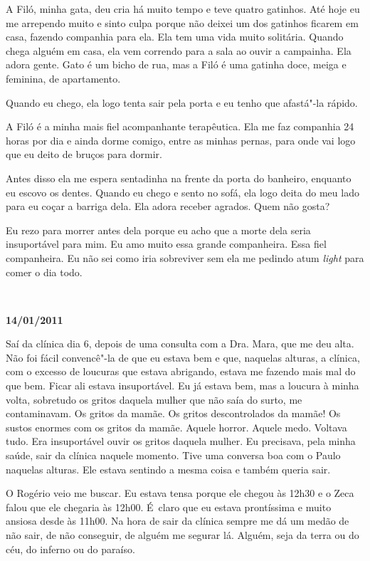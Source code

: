 A Filó, minha gata, deu cria há muito tempo e teve quatro gatinhos. Até
hoje eu me arrependo muito e sinto culpa porque não deixei um dos
gatinhos ficarem em casa, fazendo companhia para ela. Ela tem uma vida
muito solitária. Quando chega alguém em casa, ela vem correndo para a
sala ao ouvir a campainha. Ela adora gente. Gato é um bicho de rua, mas
a Filó é uma gatinha doce, meiga e feminina, de apartamento.

Quando eu chego, ela logo tenta sair pela porta e eu tenho que afastá"-la
rápido.

A Filó é a minha mais fiel acompanhante terapêutica. Ela me faz
companhia 24 horas por dia e ainda dorme comigo, entre as minhas pernas,
para onde vai logo que eu deito de bruços para dormir.

Antes disso ela me espera sentadinha na frente da porta do banheiro,
enquanto eu escovo os dentes. Quando eu chego e sento no sofá, ela logo
deita do meu lado para eu coçar a barriga dela. Ela adora receber
agrados. Quem não gosta?

Eu rezo para morrer antes dela porque eu acho que a morte dela seria
insuportável para mim. Eu amo muito essa grande companheira. Essa fiel
companheira. Eu não sei como iria sobreviver sem ela me pedindo atum
\emph{light} para comer o dia todo.

\begin{center}\asterisc{}​\end{center}

\begin{flushright}\textbf{14/01/2011}\end{flushright}


Saí da clínica dia 6, depois de uma consulta com a Dra. Mara, que me deu
alta. Não foi fácil convencê"-la de que eu estava bem e que, naquelas
alturas, a clínica, com o excesso de loucuras que estava abrigando,
estava me fazendo mais mal do que bem. Ficar ali estava insuportável. Eu
já estava bem, mas a loucura à minha volta, sobretudo os gritos daquela
mulher que não saía do surto, me contaminavam. Os gritos da mamãe. Os
gritos descontrolados da mamãe! Os sustos enormes com os gritos da
mamãe. Aquele horror. Aquele medo. Voltava tudo. Era insuportável ouvir
os gritos daquela mulher. Eu precisava, pela minha saúde, sair da
clínica naquele momento. Tive uma conversa boa com o Paulo naquelas
alturas. Ele estava sentindo a mesma coisa e também queria sair.

O Rogério veio me buscar. Eu estava tensa porque ele chegou às 12h30 e o
Zeca falou que ele chegaria às 12h00. É~claro que eu estava prontíssima
e muito ansiosa desde às 11h00. Na hora de sair da clínica sempre me dá
um medão de não sair, de não conseguir, de alguém me segurar lá. Alguém,
seja da terra ou do céu, do inferno ou do paraíso.




